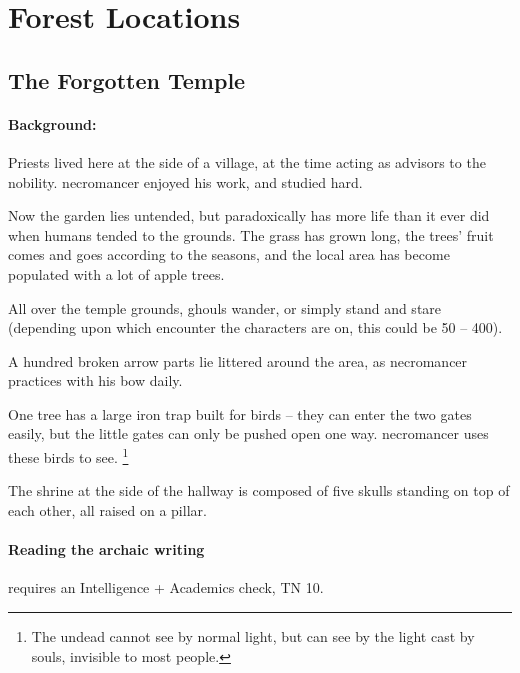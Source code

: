 \section{Forest Locations}

\begin{multicols}{2}

\setcounter{list}{0}

\subsection{The Forgotten Temple}\label{necromancers_lair}


\paragraph{Background:}
Priests lived here at the side of a village, at the time acting as advisors to the nobility.
\Gls{necromancer} enjoyed his work, and studied hard.

Now the garden lies untended, but paradoxically has more life than it ever did when humans tended to the grounds.
The grass has grown long, the trees' fruit comes and goes according to the seasons, and the local area has become populated with a lot of apple trees.


All over the temple grounds, ghouls wander, or simply stand and stare
(depending upon which encounter the characters are on, this could be 50 -- 400).

A hundred broken arrow parts lie littered around the area, as \gls{necromancer} practices with his bow daily.

One tree has a large iron trap built for birds -- they can enter the two gates easily, but the little gates can only be pushed open one way.
\Gls{necromancer} uses these birds to see.%
\footnote{The undead cannot see by normal light, but can see by the light cast by souls, invisible to most people.}



The shrine at the side of the hallway is composed of five skulls standing on top of each other, all raised on a pillar.

\paragraph{Reading the archaic writing}
requires an Intelligence + Academics check, TN 10.


\end{multicols}
